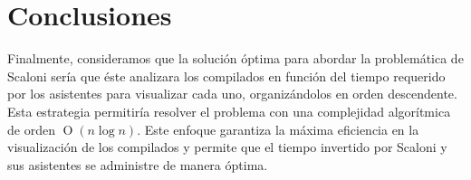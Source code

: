 \section{Conclusiones}

Finalmente, consideramos que la solución óptima para abordar la problemática de Scaloni sería que
éste analizara los compilados en función del tiempo requerido por los asistentes para vi\-sualizar
cada uno, organizándolos en orden descendente.
Esta estrategia permitiría resolver el problema con una complejidad algorítmica de orden 
$\operatorname{O}(n\log{n})$.
Este enfoque garantiza la máxima eficiencia en la visualización de los compilados y permite que el 
tiempo invertido por Scaloni y sus asistentes se administre de manera óptima.
